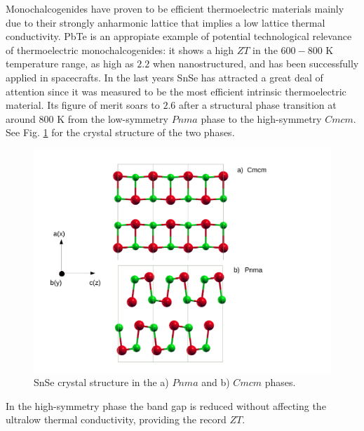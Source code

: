 Monochalcogenides have proven to be efficient thermoelectric materials\cite{heremans2008enhancement,zhang2013high,yang2008nanostructures,cho2011thermoelectric} mainly due to their strongly anharmonic lattice that implies a low 
lattice thermal conductivity\cite{delaire2011giant,li2014phonon,iizumi1975phase,o2017inelastic,ribeiro2018strong}. PbTe is an appropiate example of potential technological relevance of thermoelectric monochalcogenides: it shows 
a high $ZT$ in the $600-800$ K temperature range\cite{ravich2013semiconducting}, as high as $2.2$ when nanostructured\cite{hsu2004cubic}, and has been successfully applied in spacecrafts\cite{rowe2018thermoelectrics}. In the last 
years SnSe has attracted a great deal of attention since it was measured to be the most efficient intrinsic thermoelectric material\cite{zhao2014ultralow}. Its figure of merit soars to $2.6$ after a structural phase 
transition\cite{zhao2014ultralow,adouby1998structure,chattopadhyay1986neutron,von1981high,chatterji2018soft} at around $800$ K from the low-symmetry $Pnma$ phase to the high-symmetry $Cmcm$. See Fig. \ref{pnma-cmcm} for the crystal 
structure of the two phases.
\begin{figure}[h]
\begin{center}
\includegraphics[width=0.8\linewidth]{Figures/pnma-cmcm.pdf}
\caption{SnSe crystal structure in the a) $Pnma$ and b) $Cmcm$ phases.}
\label{pnma-cmcm}
\end{center}
\end{figure}
In the high-symmetry phase the band gap is reduced without affecting the ultralow thermal conductivity, providing the record $ZT$. \\

